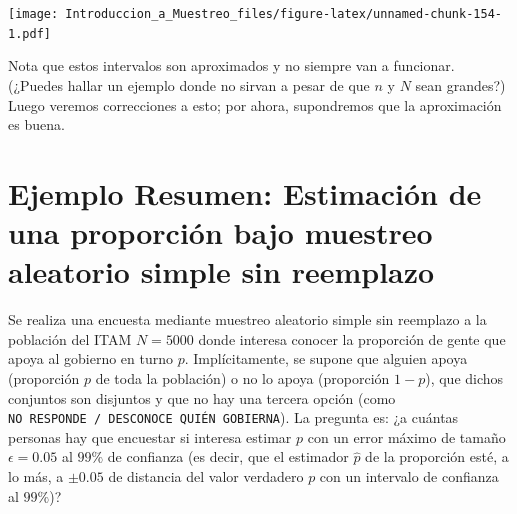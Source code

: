 \documentclass[
]{book}
\newenvironment{Shaded}{\begin{snugshade}}{\end{snugshade}}
\newcommand{\AttributeTok}[1]{\textcolor[rgb]{0.77,0.63,0.00}{#1}}
\newcommand{\DecValTok}[1]{\textcolor[rgb]{0.00,0.00,0.81}{#1}}
\newcommand{\FunctionTok}[1]{\textcolor[rgb]{0.00,0.00,0.00}{#1}}
\newcommand{\NormalTok}[1]{#1}
\newcommand{\SpecialCharTok}[1]{\textcolor[rgb]{0.00,0.00,0.00}{#1}}
\newcommand{\StringTok}[1]{\textcolor[rgb]{0.31,0.60,0.02}{#1}}
\begin{document}
\begin{Shaded}
\end{Shaded}

\texttt{[image: Introduccion\_a\_Muestreo\_files/figure-latex/unnamed-chunk-154-1.pdf]}

Nota que estos intervalos son aproximados y no siempre van a funcionar. (¿Puedes hallar un ejemplo donde no sirvan a pesar de que \(n\) y \(N\) sean grandes?) Luego veremos correcciones a esto; por ahora, supondremos que la aproximación es buena.

\hypertarget{ejemplo-resumen-estimaciuxf3n-de-una-proporciuxf3n-bajo-muestreo-aleatorio-simple-sin-reemplazo}{%
\section{Ejemplo Resumen: Estimación de una proporción bajo muestreo aleatorio simple sin reemplazo}\label{ejemplo-resumen-estimaciuxf3n-de-una-proporciuxf3n-bajo-muestreo-aleatorio-simple-sin-reemplazo}}

Se realiza una encuesta mediante muestreo aleatorio simple sin reemplazo a la población del ITAM \(N = 5000\) donde interesa conocer la proporción de gente que apoya al gobierno en turno \(p\). Implícitamente, se supone que alguien apoya (proporción \(p\) de toda la población) o no lo apoya (proporción \(1-p\)), que dichos conjuntos son disjuntos y que no hay una tercera opción (como \texttt{NO\ RESPONDE\ /\ DESCONOCE\ QUIÉN\ GOBIERNA}). La pregunta es: ¿a cuántas personas hay que encuestar si interesa estimar \(p\) con un error máximo de tamaño \(\epsilon = 0.05\) al \(99\%\) de confianza (es decir, que el estimador \(\hat{p}\) de la proporción esté, a lo más, a \(\pm 0.05\) de distancia del valor verdadero \(p\) con un intervalo de confianza al \(99\%\))?
\end{document}
